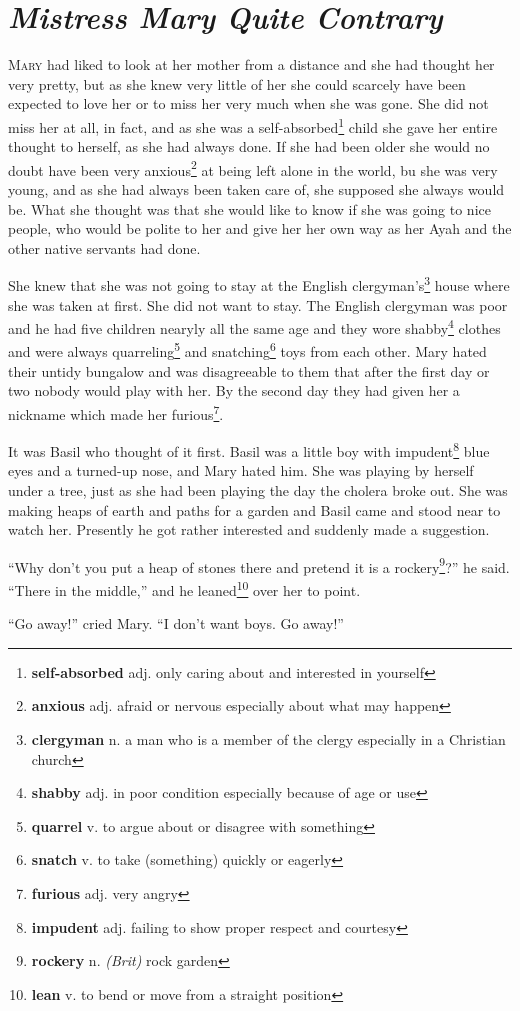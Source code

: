 \chapter{\textit{Mistress Mary Quite Contrary}}
\lettrine{M}{ary} had liked to look at her mother from a distance and she had thought her very pretty, but as she knew very little of her she could scarcely have been expected to love her or to miss her very much when she was gone. She did not miss her at all, in fact, and as she was a self-absorbed\footnote{\textbf{self-absorbed} adj. only caring about and interested in yourself} child she gave her entire thought to herself, as she had always done. If she had been older she would no doubt have been very anxious\footnote{\textbf{anxious} adj. afraid or nervous especially about what may happen} at being left alone in the world, bu she was very young, and as she had always been taken care of, she supposed she always would be. What she thought was that she would like to know if she was going to nice people, who would be polite to her and give her her own way as her Ayah and the other native servants had done.

She knew that she was not going to stay at the English clergyman's\footnote{\textbf{clergyman} n. a man who is a member of the clergy especially in a Christian church} house where she was taken at first. She did not want to stay. The English clergyman was poor and he had five children nearyly all the same age and they wore shabby\footnote{\textbf{shabby} adj. in poor condition especially because of age or use} clothes and were always quarreling\footnote{\textbf{quarrel} v. to argue about or disagree with something} and snatching\footnote{\textbf{snatch} v. to take (something) quickly or eagerly} toys from each other. Mary hated their untidy bungalow and was disagreeable to them that after the first day or two nobody would play with her. By the second day they had given her a nickname which made her furious\footnote{\textbf{furious} adj. very angry}.

It was Basil who thought of it first. Basil was a little boy with impudent\footnote{\textbf{impudent} adj. failing to show proper respect and courtesy} blue eyes and a turned-up nose, and Mary hated him. She was playing by herself under a tree, just as she had been playing the day the cholera broke out. She was making heaps of earth and paths for a garden and Basil came and stood near to watch her. Presently he got rather interested and suddenly made a suggestion.

``Why don't you put a heap of stones there and pretend it is a rockery\footnote{\textbf{rockery} n. \textit{(Brit)} rock garden}?'' he said. ``There in the middle,'' and he leaned\footnote{\textbf{lean} v. to bend or move from a straight position} over her to point.

``Go away!'' cried Mary. ``I don't want boys. Go away!''
